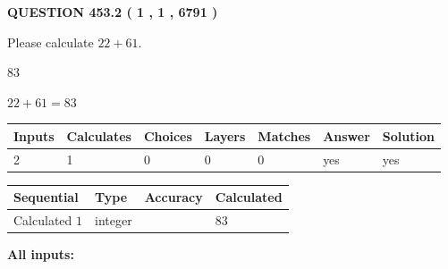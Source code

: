 \documentclass[12pt]{article}
\begin{document}
   
  
\vspace{0.2in}
  
{\textbf{\Large{QUESTION
453.2 
 ( 1 , 1 , 6791 )
}}}
  
  
 
Please calculate $ %
22 +  %
61 $.
 
 
 
\noindent{}
 
 

83
 
 
\noindent{}
 
 

 
 
 
\noindent{}
 
 

$ %
22 +  %
61=   %
83$
 
 
\noindent{}
 
 

 
   
   
   
   
\noindent\begin{tabular}{|l|l|l|l|l|l|l|}
 \hline
Inputs & Calculates & Choices & Layers & Matches & Answer & Solution \\ \hline
 2  & 
 1  & 
 0
  & 
 0  & 
 0  & 
  yes & 
  yes 
  \\ \hline
 \end{tabular}
   
   
   
   
\noindent{}
   
   
  
  
\noindent\begin{tabular}{|l|l|l|l|}
\hline
 Sequential & Type & Accuracy & Calculated \\ 
\hline
 
 
  Calculated $  1 $ & integer &  & 
  $ 83 $ 
 \\  \hline  
 \end{tabular}
   
   
   
   
\noindent\vspace{0.1in}\hspace{-0.08in} {\textbf{\Large{All inputs: }}}
   
\end{document}
